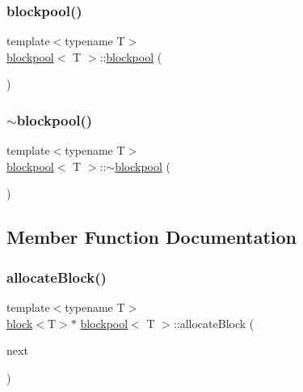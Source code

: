 \subsubsection{\texorpdfstring{blockpool()}{blockpool()}}
{\footnotesize\ttfamily template$<$typename T$>$ \\
\hyperlink{classblockpool}{blockpool}$<$ T $>$\+::\hyperlink{classblockpool}{blockpool} (\begin{DoxyParamCaption}{ }\end{DoxyParamCaption})\hspace{0.3cm}{\ttfamily [inline]}}

\mbox{\label{classblockpool_a4f9b57b1f040a7940d4838ae293b91b1}} 
\subsubsection{\texorpdfstring{$\sim$blockpool()}{~blockpool()}}
{\footnotesize\ttfamily template$<$typename T$>$ \\
\hyperlink{classblockpool}{blockpool}$<$ T $>$\+::$\sim$\hyperlink{classblockpool}{blockpool} (\begin{DoxyParamCaption}{ }\end{DoxyParamCaption})\hspace{0.3cm}{\ttfamily [inline]}}



\subsection{Member Function Documentation}
\mbox{\label{classblockpool_ab0c6542e74f50af2cc27ae2a18200cc6}} 
\subsubsection{\texorpdfstring{allocate\+Block()}{allocateBlock()}}
{\footnotesize\ttfamily template$<$typename T$>$ \\
\hyperlink{classblock}{block}$<$T$>$$\ast$ \hyperlink{classblockpool}{blockpool}$<$ T $>$\+::allocate\+Block (\begin{DoxyParamCaption}\item[{\hyperlink{classblock}{block}$<$ T $>$ $\ast$const}]{next }\end{DoxyParamCaption})\hspace{0.3cm}{\ttfamily [inline]}}

